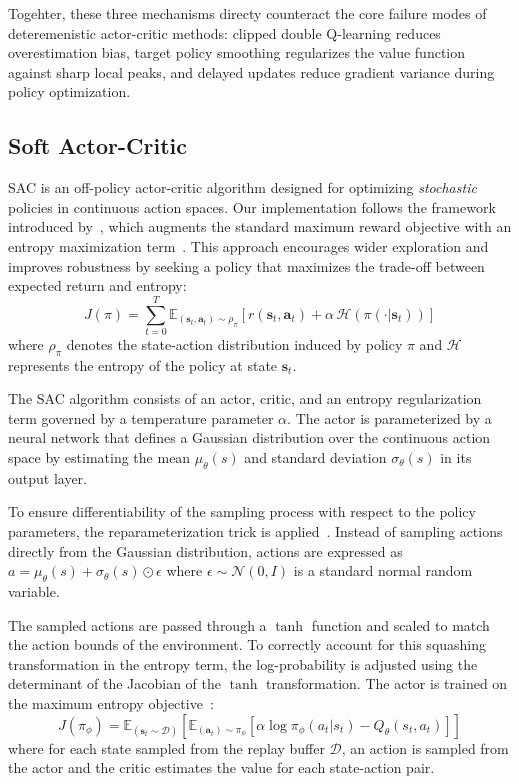 \medskip
Togehter, these three mechanisms directy counteract the core failure modes of deteremenistic actor-critic methods:
clipped double Q-learning reduces overestimation bias, target policy smoothing 
regularizes the value function against sharp local peaks,
and delayed updates reduce gradient variance during policy optimization.

\subsection{Soft Actor-Critic}
\label{sec:sac}

\ac{SAC} is an off-policy actor-critic algorithm designed for optimizing \emph{stochastic} policies in
continuous action spaces.
Our implementation follows the framework introduced by~\cite{haarnoja2018:SOFT}, which augments the
standard maximum reward objective with an entropy maximization term~\cite{ziebart2010}.
This approach encourages wider exploration and improves robustness by seeking a policy that
maximizes the trade-off between expected return and entropy:
\begin{equation}
  J(\pi) = \sum_{t=0}^{T}
    \mathbb{E}_{(\mathbf{s}_t,\mathbf{a}_t)\sim\rho_\pi}\!\left[
      r(\mathbf{s}_t,\mathbf{a}_t) + \alpha\,\mathcal{H}\!\left(\pi(\cdot|\mathbf{s}_t)\right)
    \right]
\end{equation}
where $\rho_\pi$ denotes the state-action distribution induced by policy $\pi$ and $\mathcal{H}$
represents the entropy of the policy at state $\mathbf{s}_t$.

\medskip
The \ac{SAC} algorithm consists of an actor, critic, and an entropy regularization term governed
by a temperature parameter $\alpha$.
The actor is parameterized by a neural network that defines a Gaussian distribution over the
continuous action space by estimating the mean $\mu_\theta(s)$ and standard deviation
$\sigma_\theta(s)$ in its output layer.

\medskip
To ensure differentiability of the sampling process with respect to the policy parameters, the
reparameterization trick is applied~\cite{haarnoja2018:SOFT, kingma2014auto}.
Instead of sampling actions directly from the Gaussian distribution, actions are expressed as
$a = \mu_\theta(s) + \sigma_\theta(s) \odot \epsilon$ where $\epsilon \sim \mathcal{N}(0, I)$ is
a standard normal random variable.

The sampled actions are passed through a $\tanh$ function and scaled to match the action bounds
of the environment.
To correctly account for this squashing transformation in the entropy term, the log-probability
is adjusted using the determinant of the Jacobian of the $\tanh$ transformation.
The actor is trained on the maximum entropy objective~\cite{haarnoja2018:SOFT}:
\begin{equation}
  J(\pi_\phi) =
    \mathbb{E}_{(\mathbf{s}_t \sim \mathcal{D})}\!\left[
      \mathbb{E}_{(\mathbf{a}_t) \sim \pi_\phi}\!\left[
        \alpha \log \pi_\phi(a_t|s_t) - Q_\theta(s_t, a_t)
      \right]
    \right]
\end{equation}
where for each state sampled from the replay buffer $\mathcal{D}$, an action is sampled from the
actor and the critic estimates the value for each state-action pair.

